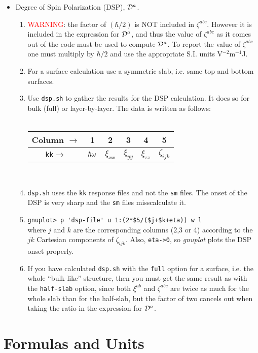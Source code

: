 \begin{itemize}
\item Degree of Spin Polarization (DSP), ${\mathbf{\cal D}}^a$.
\begin{enumerate}
\item \textcolor{red}{WARNING}: the factor of $(\hbar/2)$ is NOT
  included in $\zeta^{abc}$. However it is included in the expression
  for ${\mathbf{\cal D}}^a$, and thus the value of $\zeta^{abc}$ as it comes out
  of the code must be used to compute ${\mathbf{\cal D}}^a$. To report the value
  of $\zeta^{abc}$ one must multiply by $\hbar/2$ and use the
  appropriate S.I. units V$^{-2}$m$^{-1}$J.
\item For a surface calculation use a symmetric slab, i.e. same top
  and bottom surfaces.
\item Use \verb=dsp.sh= to gather the results for the DSP calculation. It
  does so for bulk (full) or layer-by-layer. The data is written as
follows:\\\\
\begin{tabular}{|c|c|c|c|c|c|}\hline
Column $\to$  & 1 & 2 & 3 & 4 &5 \\\hline
\verb=kk=$\to$  & $\hbar\omega$  & $\xi_{xx}$  &
$\xi_{yy}$ &$\xi_{zz}$ & $\zeta_{ijk}$ \\ \hline
\end{tabular}\\
\item \verb=dsp.sh= uses the \verb=kk= response files and not the \verb=sm=
files. The onset of the DSP is very sharp and the \verb=sm= files
misscalculate it.
\item\verb=gnuplot> p 'dsp-file' u 1:(2*$5/($j+$k+eta)) w l=\\
where $j$ and $k$ are the corresponding columns (2,3 or 4) according to the $jk$
Cartesian components of $\zeta_{ijk}$. Also,
\verb=eta->0=, so {\it gnuplot} plots the DSP onset properly.
\item If you have calculated \verb=dsp.sh= with the \verb=full= option
  for a surface, i.e. the whole ``bulk-like''
 structure,
 then you must get the same result as with the
  \verb=half-slab= option, since both $\xi^{ab}$ and $\zeta^{abc}$ are
  twice as much for the whole slab than for the half-slab, but the
  factor of two cancels out when taking the ratio in the expression for ${\mathbf{\cal D}}^a$.
\end{enumerate}

\end{itemize}

\section{Formulas and Units}


